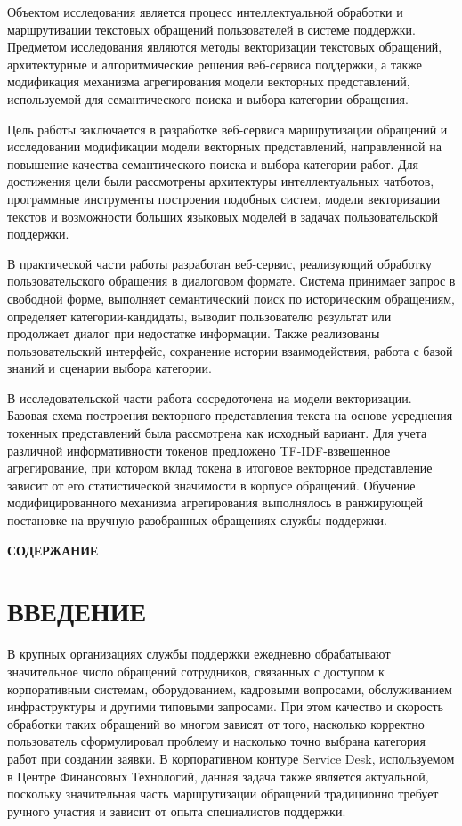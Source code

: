 \documentclass[14pt,a4paper]{extarticle}
\makeatletter
\newcommand{\printcontents}{%
  {\centering\bfseries СОДЕРЖАНИЕ\par}%
  \vspace{12pt}%
  \@starttoc{toc}%
}
\numberwithin{figure}{section}
\numberwithin{table}{section}
\makeatother
\begin{document}
Объектом исследования является процесс интеллектуальной обработки и
маршрутизации текстовых обращений пользователей в системе поддержки.
Предметом исследования являются методы векторизации текстовых обращений,
архитектурные и алгоритмические решения веб-сервиса поддержки, а также
модификация механизма агрегирования модели векторных представлений, используемой для
семантического поиска и выбора категории обращения.

Цель работы заключается в разработке веб-сервиса маршрутизации обращений
и исследовании модификации модели векторных представлений, направленной на повышение
качества семантического поиска и выбора категории работ. Для достижения
цели были рассмотрены архитектуры интеллектуальных чатботов, программные
инструменты построения подобных систем, модели векторизации текстов и
возможности больших языковых моделей в задачах пользовательской
поддержки.

В практической части работы разработан веб-сервис, реализующий обработку
пользовательского обращения в диалоговом формате. Система принимает
запрос в свободной форме, выполняет семантический поиск по историческим
обращениям, определяет категории-кандидаты, выводит пользователю
результат или продолжает диалог при недостатке информации. Также
реализованы пользовательский интерфейс, сохранение истории
взаимодействия, работа с базой знаний и сценарии выбора категории.

В исследовательской части работа сосредоточена на модели векторизации.
Базовая схема построения векторного представления текста на основе усреднения токенных представлений была
рассмотрена как исходный вариант. Для учета различной информативности
токенов предложено TF-IDF-взвешенное агрегирование, при котором вклад токена в
итоговое векторное представление зависит от его статистической значимости в корпусе
обращений. Обучение модифицированного механизма агрегирования выполнялось в
ранжирующей постановке на вручную разобранных обращениях службы поддержки.

\clearpage
\begingroup
\makeatletter
\let\ps@plain\ps@empty
\makeatother
\pagestyle{empty}
\printcontents
\thispagestyle{empty}
\clearpage
\endgroup
\pagestyle{plain}
\section*{ВВЕДЕНИЕ}

В крупных организациях службы поддержки ежедневно обрабатывают
значительное число обращений сотрудников, связанных с доступом к
корпоративным системам, оборудованием, кадровыми вопросами,
обслуживанием инфраструктуры и другими типовыми запросами. При этом
качество и скорость обработки таких обращений во многом зависят от того,
насколько корректно пользователь сформулировал проблему и насколько
точно выбрана категория работ при создании заявки. В корпоративном
контуре Service Desk, используемом в Центре Финансовых Технологий,
данная задача также является актуальной, поскольку значительная часть
маршрутизации обращений традиционно требует ручного участия и зависит от
опыта специалистов поддержки.
\end{document}
